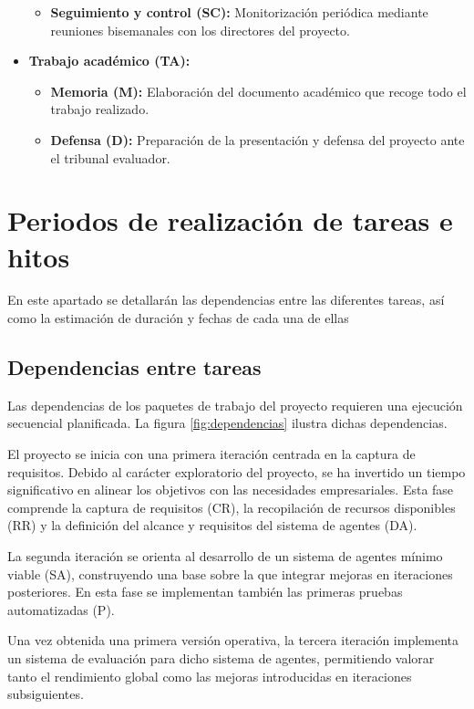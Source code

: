 \begin{itemize}
\begin{itemize}
      \item\textbf{Seguimiento y control (SC):} Monitorización periódica mediante reuniones bisemanales con los directores del proyecto.
    \end{itemize}
  \item\textbf{Trabajo académico (TA):}
    \begin{itemize}
      \item\textbf{Memoria (M):} Elaboración del documento académico que recoge todo el trabajo realizado.
      \item\textbf{Defensa (D):} Preparación de la presentación y defensa del proyecto ante el tribunal evaluador.
    \end{itemize}
\end{itemize}

\section{Periodos de realización de tareas e hitos}
En este apartado se detallarán las dependencias entre las diferentes tareas, así como la estimación de duración y fechas de cada una de ellas

\subsection{Dependencias entre tareas}
Las dependencias de los paquetes de trabajo del proyecto requieren una ejecución secuencial planificada. La figura \ref{fig:dependencias} ilustra dichas dependencias.

El proyecto se inicia con una primera iteración centrada en la captura de requisitos. Debido al carácter exploratorio del proyecto, se ha invertido un tiempo significativo en alinear los objetivos con las necesidades empresariales. Esta fase comprende la captura de requisitos (CR), la recopilación de recursos disponibles (RR) y la definición del alcance y requisitos del sistema de agentes (DA).

La segunda iteración se orienta al desarrollo de un sistema de agentes mínimo viable (SA), construyendo una base sobre la que integrar mejoras en iteraciones posteriores. En esta fase se implementan también las primeras pruebas automatizadas (P).

Una vez obtenida una primera versión operativa, la tercera iteración implementa un sistema de evaluación para dicho sistema de agentes, permitiendo valorar tanto el rendimiento global como las mejoras introducidas en iteraciones subsiguientes.

